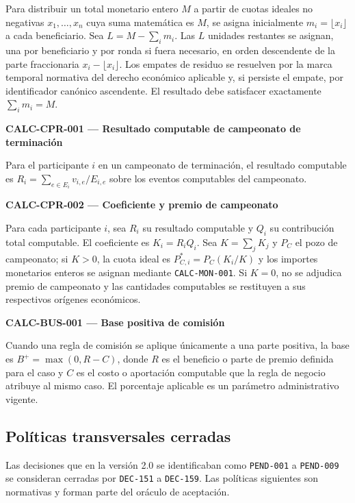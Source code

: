 \documentclass[10pt,letterpaper]{article}
\begin{document}
Para distribuir un total monetario entero $M$ a partir de cuotas ideales no negativas $x_1,\ldots,x_n$ cuya suma matemática es $M$, se asigna inicialmente $m_i=\lfloor x_i\rfloor$ a cada beneficiario. Sea $L=M-\sum_i m_i$. Las $L$ unidades restantes se asignan, una por beneficiario y por ronda si fuera necesario, en orden descendente de la parte fraccionaria $x_i-\lfloor x_i\rfloor$. Los empates de residuo se resuelven por la marca temporal normativa del derecho económico aplicable y, si persiste el empate, por identificador canónico ascendente. El resultado debe satisfacer exactamente $\sum_i m_i=M$.\par\vspace{0.5em}
\noindent\textbf{CALC-CPR-001 --- Resultado computable de campeonato de terminación}\par
Para el participante $i$ en un campeonato de terminación, el resultado computable es $R_i=\sum_{e\in E_i} v_{i,e}/E_{i,e}$ sobre los eventos computables del campeonato.\par\vspace{0.5em}
\noindent\textbf{CALC-CPR-002 --- Coeficiente y premio de campeonato}\par
Para cada participante $i$, sea $R_i$ su resultado computable y $Q_i$ su contribución total computable. El coeficiente es $K_i=R_iQ_i$. Sea $K=\sum_jK_j$ y $P_C$ el pozo de campeonato; si $K>0$, la cuota ideal es $P_{C,i}^*=P_C(K_i/K)$ y los importes monetarios enteros se asignan mediante \texttt{CALC-MON-001}. Si $K=0$, no se adjudica premio de campeonato y las cantidades computables se restituyen a sus respectivos orígenes económicos.\par\vspace{0.5em}
\noindent\textbf{CALC-BUS-001 --- Base positiva de comisión}\par
Cuando una regla de comisión se aplique únicamente a una parte positiva, la base es $B^+=\max(0,R-C)$, donde $R$ es el beneficio o parte de premio definida para el caso y $C$ es el costo o aportación computable que la regla de negocio atribuye al mismo caso. El porcentaje aplicable es un parámetro administrativo vigente.\par\vspace{0.5em}
\subsection{Políticas transversales cerradas}
Las decisiones que en la versión 2.0 se identificaban como \texttt{PEND-001} a \texttt{PEND-009} se consideran cerradas por \texttt{DEC-151} a \texttt{DEC-159}. Las políticas siguientes son normativas y forman parte del oráculo de aceptación.
\end{document}
